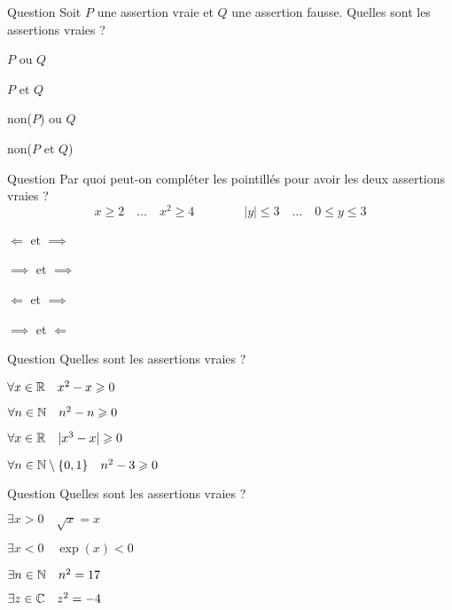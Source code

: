

\begin{multi}[multiple,feedback=
{\(P\) ou \(Q\) est vraie. Comme \(P\) et \(Q\) est fausse alors non(\(P\) et \(Q\)) est vraie.
}]{Question}
Soit \(P\) une assertion vraie et \(Q\) une assertion fausse. Quelles sont les assertions vraies ?

    \item* \(P\) ou \(Q\)
    \item \(P\) et \(Q\)
    \item non(\(P\)) ou \(Q\)
    \item* non(\(P\) et \(Q\))
\end{multi}


\begin{multi}[multiple,feedback=
{Si \(x\ge 2\) alors \(x^2 \ge 4\), la réciproque est fausse.
Si \(0 \le y \le 3\) alors \(|y| \le 3\), la réciproque est fausse.
}]{Question}
Par quoi peut-on compléter les pointillés pour avoir les deux assertions vraies ?
\[x\ge 2 \quad \ldots \quad x^2 \ge 4  \qquad \qquad |y| \le 3 \quad \ldots \quad 0 \le y \le 3\]

    \item \(\Longleftarrow\) et \(\implies\)
    \item \(\implies\) et \(\implies\)
    \item \(\Longleftarrow\) et \(\implies\)
    \item* \(\implies\) et \(\Longleftarrow\)
\end{multi}


\begin{multi}[multiple,feedback=
{Attention, \(x^2-x\) est négatif pour \(x=\frac12\) par exemple !
}]{Question}
Quelles sont les assertions vraies ?

    \item \(\forall x \in \mathbb{R} \quad x^2-x \geqslant 0\)
    \item* \(\forall n \in \mathbb{N} \quad n^2-n \geqslant 0\)
    \item* \(\forall x \in \mathbb{R} \quad |x^3-x| \geqslant 0\)
    \item* \(\forall n \in \mathbb{N} \setminus \{0,1\} \quad n^2-3 \geqslant 0\)
\end{multi}


\begin{multi}[multiple,feedback=
{Oui il existe \(x>0\) tel que \(\sqrt{x} = x\), c'est \(x=1\).
}]{Question}
Quelles sont les assertions vraies ?

    \item* \(\exists x>0 \quad \sqrt{x} = x\)
    \item \(\exists x <0 \quad \exp(x) < 0\)
    \item \(\exists n \in \mathbb{N} \quad n^2 = 17\)
    \item* \(\exists z \in \mathbb{C} \quad z^2 = -4\)
\end{multi}


